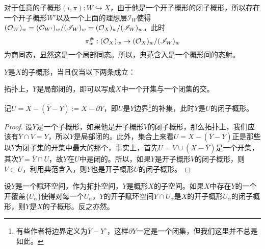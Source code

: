 \begin{para}[典范含入的局部刻画]
对于任意的子概形$(i,\pi):W\hookrightarrow X$，由于他是一个开子概形的闭子概形，所以存在一个开子概形$W'$以及一个上面的理想层$\mathscr I_W$使得$(\mathcal{O}_W)_w=(\mathcal{O}_{W'})_w/(\mathscr I_W)_w=(\mathcal{O}_{X})_w/(\mathscr I_W)_w$，此时
\[
	\pi_w^\#:(\mathcal{O}_X)_w\to (\mathcal{O}_{X})_w/(\mathscr I_W)_w
\]
为商同态，显然这是一个局部同态。所以，典范含入是一个概形间的态射。
\end{para}

\begin{pro}[子概形的刻画]
$Y$是$X$的子概形，当且仅当以下两条成立：
\begin{compactenum}[~~~1.]
\item 拓扑上，$Y$是局部闭的，即可以写成$X$中一个开集与一个闭集的交。
\item 记$U=X-(\overline{Y}-Y):=X-\partial Y$，即$U$是$Y$边界\footnote{有些作者将边界定义为$\overline{Y}-Y^\circ$，这样$\partial Y$一定是一个闭集，但我们这里并不总是如此。}的补集，此时$Y$是$U$的闭子概形。
\end{compactenum}
\end{pro}

\begin{proof}
	设$Y$是一个子概形，如果他是开子概形$V$的闭子概形，那么拓扑上，我们应该有$\overline{Y}\cap V=Y$，所以$Y$是局部闭的。此外，集合上来看$U=X-(\overline{Y}-Y)$正是那些以$Y$为闭子集的开集中最大的那个，事实上，首先$U=V\cup (X-\overline{Y})$是一个开集，其次$Y=\overline{Y}\cap U$，故$Y$在$U$中是闭的。所以，如果$Y$是开子概形$V$的闭子概形，则$V\subset U$，利用典范含入，则$Y$也是开子概形$U$的闭子概形。
\end{proof}

\begin{pro}[子概形的局部刻画]\label{pro:3.3.8}
设$Y$是一个赋环空间，作为拓扑空间，$Y$是概形$X$的子空间。如果$X$中存在$Y$的一个开覆盖$\{U_\alpha\}$使得对每一个$U_\alpha$，$Y$的开子赋环空间$Y\cap U_\alpha$是$X$的开子概形$U_\alpha$的闭子概形，则$Y$是$X$的子概形。反之亦然。
\end{pro}

